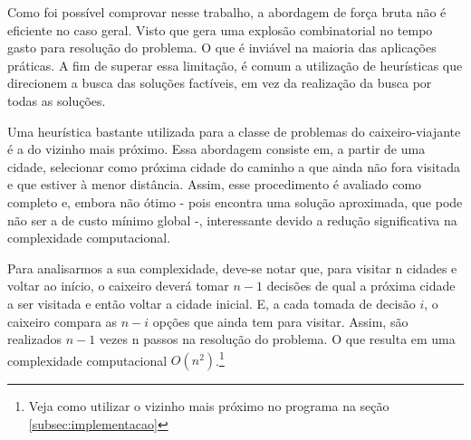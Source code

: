 \documentclass[a4paper, 12pt]{article} %
\begin{document}
	Como foi possível comprovar nesse trabalho, a abordagem de força bruta não é eficiente no caso geral. Visto que gera uma explosão combinatorial no tempo gasto para resolução do problema. O que é inviável na maioria das aplicações práticas. A fim de superar essa limitação, é comum a utilização de heurísticas que direcionem a busca das soluções factíveis, em vez da realização da busca por todas as soluções.
	
	Uma heurística bastante utilizada para a classe de problemas do caixeiro-viajante é a do vizinho mais próximo. Essa abordagem consiste em, a partir de uma cidade, selecionar como próxima cidade do caminho a que ainda não fora visitada e que estiver à menor distância. Assim, esse procedimento é avaliado como completo e, embora não ótimo - pois encontra uma solução aproximada, que pode não ser a de custo mínimo global -, interessante devido a redução significativa na complexidade computacional.
	
	Para analisarmos a sua complexidade, deve-se notar que, para visitar n cidades e voltar ao início, o caixeiro deverá tomar $n-1$ decisões de qual a próxima cidade a ser visitada e então voltar a cidade inicial. E, a cada tomada de decisão $i$, o caixeiro compara as $n-i$ opções que ainda tem para visitar. Assim, são realizados $n-1$ vezes n passos na resolução do problema. O que resulta em uma complexidade computacional $O(n^2)$.\footnote{Veja como utilizar o vizinho mais próximo no programa na seção \ref{subsec:implementacao}}

	
\end{document}
